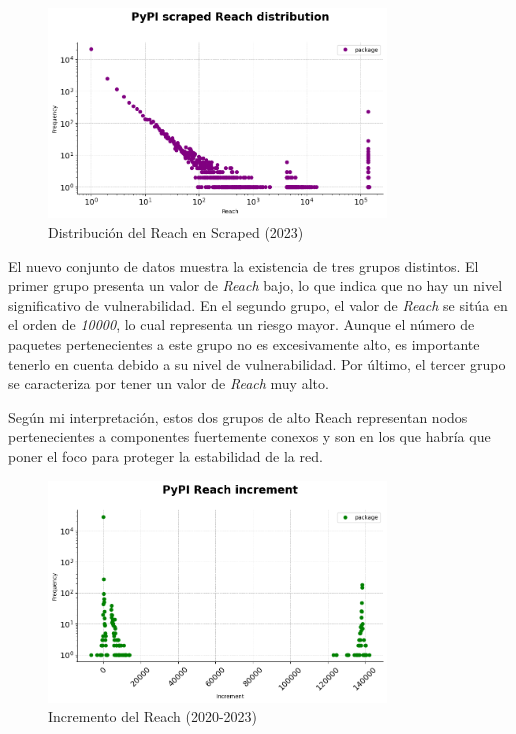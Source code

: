 \begin{figure}[ht!]
    \begin{center}
        \includegraphics[width=0.8\textwidth]{img/pypi/scraped_reach_distribution.png}
        \caption{Distribución del Reach en Scraped (2023)}
    \end{center}
    \label{fig:Distribución del Reach en Scraped}
\end{figure}

El nuevo conjunto de datos muestra la existencia de tres grupos distintos. El primer grupo presenta
un valor de \textit{Reach} bajo, lo que indica que no hay un nivel significativo de vulnerabilidad. En el
segundo grupo, el valor de \textit{Reach} se sitúa en el orden de \textit{10000}, lo cual representa un riesgo mayor.
Aunque el número de paquetes pertenecientes a este grupo no es excesivamente alto, es importante
tenerlo en cuenta debido a su nivel de vulnerabilidad. Por último, el tercer grupo se caracteriza
por tener un valor de \textit{Reach} muy alto.

Según mi interpretación, estos dos grupos de alto Reach representan nodos pertenecientes a componentes
fuertemente conexos y son en los que habría que poner el foco para proteger la estabilidad de la red.

\begin{figure}[ht!]
    \begin{center}
        \includegraphics[width=0.8\textwidth]{img/pypi/reach_increment.png}
        \caption{Incremento del Reach (2020-2023)}
    \end{center}
    \label{fig:pypi_reach_increment}
\end{figure}

